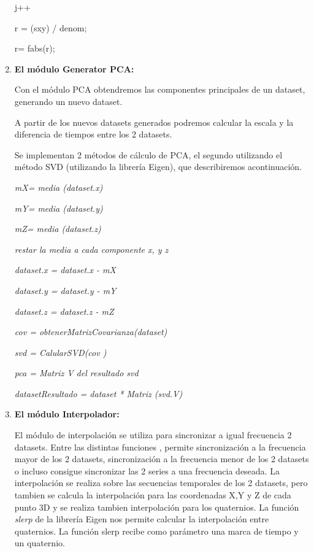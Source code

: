 \begin{enumerate}
								            		j++

								       

								       r = (sxy) / denom;

								       r= fabs(r);


	   	
	

\item \textbf{El módulo Generator PCA:}

	Con el módulo PCA obtendremos las componentes principales de un dataset, generando un nuevo dataset.

	A partir de los nuevos datasets generados podremos calcular la escala y la diferencia de tiempos entre los 2 datasets.

	Se implementan 2 métodos de cálculo de PCA, el segundo utilizando el método SVD (utilizando la librería Eigen), que describiremos acontinuación.

		
		\textit{mX= media (dataset.x)}

		\textit{mY= media (dataset.y)}

		\textit{mZ= media (dataset.z)}

	    \textit{restar la media a cada componente x, y z}

	    \textit{dataset.x = dataset.x - mX } 

	    \textit{dataset.y = dataset.y - mY }

	    \textit{dataset.z = dataset.z - mZ }

	    \textit{cov = obtenerMatrizCovarianza(dataset)}

	    \textit{svd = CalularSVD(cov )}

	    \textit{pca =  Matriz V del resultado svd}

	    \textit{datasetResultado = dataset * Matriz (svd.V)}
	    

		


\item \textbf{El módulo Interpolador:}

	El módulo de interpolación se utiliza para sincronizar a igual frecuencia 2 datasets.
	Entre las distintas funciones , permite sincronización a la frecuencia mayor de los 2 datasets, sincronización a la frecuencia menor de los 2 datasets o incluso consigue sincronizar las 2 series a una frecuencia deseada. La interpolación se realiza sobre las secuencias temporales de los 2 datasets, pero tambien se calcula la interpolación para las coordenadas X,Y y Z de cada punto 3D y se realiza tambien interpolación para los quaternios. La función \textit{slerp} de la librería Eigen nos permite calcular la interpolación entre quaternios. La función slerp recibe como parámetro una marca de tiempo y un quaternio.


\end{enumerate}

